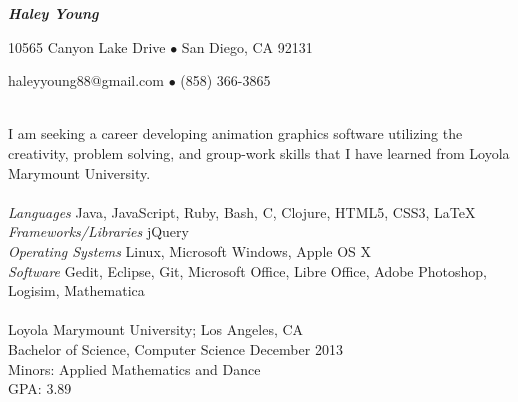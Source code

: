 \documentclass[11pt]{article}
\begin{document}
\centerline{{\Large \bf \emph{Haley Young}}}
\centerline{10565 Canyon Lake Drive $\bullet$ San Diego, CA 92131}
\centerline{haleyyoung88@gmail.com $\bullet$ (858) 366-3865}
\vspace{7 mm}

\vspace{3mm}\\
\indent I am seeking a career developing animation graphics software utilizing the creativity, problem solving, and group-work skills that I have learned from Loyola Marymount University.\\

\vspace{1.5mm}\\
\indent \emph{Languages} \hfill Java, JavaScript, Ruby, Bash, C, Clojure, HTML5, CSS3, LaTeX\\
\indent \emph{Frameworks/Libraries} \hfill jQuery\\
\indent \emph{Operating Systems} \hfill Linux, Microsoft Windows, Apple OS X\\
\indent \emph{Software} \hfill  Gedit, Eclipse, Git, Microsoft Office, Libre Office, Adobe Photoshop, Logisim, Mathematica\\

\vspace{1.5mm}\\
\indent Loyola Marymount University; Los Angeles, CA\\
\indent Bachelor of Science, Computer Science \hfill December 2013\\
\indent Minors: Applied Mathematics and Dance\\
\indent GPA: 3.89\\
\end{document}
